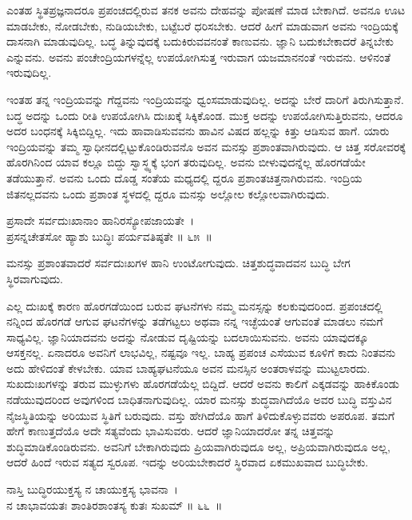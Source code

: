ಎಂತಹ ಸ್ಥಿತಪ್ರಜ್ಞನಾದರೂ ಪ್ರಪಂಚದಲ್ಲಿರುವ ತನಕ ಅವನು ದೇಹವನ್ನು ಪೋಷಣೆ ಮಾಡ ಬೇಕಾಗಿದೆ. ಅವನೂ ಊಟ ಮಾಡಬೇಕು, ನೋಡಬೇಕು, ನುಡಿಯಬೇಕು, ಬಟ್ಟೆಬರೆ ಧರಿಸಬೇಕು. ಆದರೆ ಹೀಗೆ ಮಾಡುವಾಗ ಅವನು ಇಂದ್ರಿಯಕ್ಕೆ ದಾಸನಾಗಿ ಮಾಡುವುದಿಲ್ಲ. ಬದ್ಧ ತಿನ್ನುವುದಕ್ಕೆ ಬದುಕಿರುವವನಂತೆ ಕಾಣುವನು. ಜ್ಞಾನಿ ಬದುಕಬೇಕಾದರೆ ತಿನ್ನಬೇಕು ಎನ್ನುವನು. ಅವನು ಪಂಚೇಂದ್ರಿಯಗಳನ್ನೆಲ್ಲ ಉಪಯೋಗಿಸುತ್ತ ಇರುವಾಗ ಯಜಮಾನನಂತೆ ಇರುವನು. ಆಳಿನಂತೆ ಇರುವುದಿಲ್ಲ.

ಇಂತಹ ತನ್ನ ಇಂದ್ರಿಯವನ್ನು ಗೆದ್ದವನು ಇಂದ್ರಿಯವನ್ನು ಧ್ವಂಸಮಾಡುವುದಿಲ್ಲ. ಅದನ್ನು ಬೇರೆ ದಾರಿಗೆ ತಿರುಗಿಸುತ್ತಾನೆ. ಬದ್ಧ ಅದನ್ನು ಒಂದು ರೀತಿ ಉಪಯೋಗಿಸಿ ದುಃಖಕ್ಕೆ ಸಿಕ್ಕಿಕೊಂಡ. ಮುಕ್ತ ಅದನ್ನು ಉಪಯೋಗಿಸುತ್ತಿರುವನು, ಆದರೂ ಅದರ ಬಂಧನಕ್ಕೆ ಸಿಕ್ಕಿಬಿದ್ದಿಲ್ಲ. ಇದು ಹಾವಾಡಿಸುವವನು ಹಾವಿನ ವಿಷದ ಹಲ್ಲನ್ನು ಕಿತ್ತು ಆಡಿಸುವ ಹಾಗೆ. ಯಾರು ಇಂದ್ರಿಯವನ್ನು ತಮ್ಮ ಸ್ವಾಧೀನದಲ್ಲಿಟ್ಟುಕೊಂಡಿರುವನೊ ಅವನ ಮನಸ್ಸು ಪ್ರಶಾಂತವಾಗಿರುವುದು. ಆ ಚಿತ್ತ ಸರೋವರಕ್ಕೆ ಹೊರಗಿನಿಂದ ಯಾವ ಕಲ್ಲೂ ಬಿದ್ದು ಸ್ವಾಸ್ಥ್ಯಕ್ಕೆ ಭಂಗ ತರುವುದಿಲ್ಲ. ಅವನು ಬೀಳುವುದನ್ನೆಲ್ಲ ಹೊರಗಡೆಯೇ ತಡೆಯುತ್ತಾನೆ. ಅವನು ಒಂದು ದೊಡ್ಡ ಸಂತೆಯ ಮಧ್ಯದಲ್ಲಿ ದ್ದರೂ ಪ್ರಶಾಂತಚಿತ್ತನಾಗಿರುವನು. ಇಂದ್ರಿಯ ಜಿತನಲ್ಲದವನು ಒಂದು ಪ್ರಶಾಂತ ಸ್ಥಳದಲ್ಲಿ ದ್ದರೂ ಮನಸ್ಸು ಅಲ್ಲೋಲ ಕಲ್ಲೋಲವಾಗಿರುವುದು.

\begin{shloka}
ಪ್ರಸಾದೇ ಸರ್ವದುಃಖಾನಾಂ ಹಾನಿರಸ್ಯೋಪಜಾಯತೇ~।\\ಪ್ರಸನ್ನಚೇತಸೋ ಹ್ಯಾಶು ಬುದ್ಧಿಃ ಪರ್ಯವತಿಷ್ಠತೇ \hfill॥ ೬೫~॥
\end{shloka}

\begin{artha}
ಮನಸ್ಸು ಪ್ರಶಾಂತವಾದರೆ ಸರ್ವದುಃಖಗಳ ಹಾನಿ ಉಂಟೋಗುವುದು. ಚಿತ್ತಶುದ್ಧವಾದವನ ಬುದ್ಧಿ ಬೇಗ ಸ್ಥಿರವಾಗುವುದು.
\end{artha}

ಎಲ್ಲ ದುಃಖಕ್ಕೆ ಕಾರಣ ಹೊರಗಡೆಯಿಂದ ಬರುವ ಘಟನೆಗಳು ನಮ್ಮ ಮನಸ್ಸನ್ನು ಕಲಕುವುದರಿಂದ. ಪ್ರಪಂಚದಲ್ಲಿ ನನ್ನಿಂದ ಹೊರಗಡೆ ಆಗುವ ಘಟನೆಗಳನ್ನು ತಡೆಗಟ್ಟಲು ಅಥವಾ ನನ್ನ ಇಚ್ಛೆಯಂತೆ ಆಗುವಂತೆ ಮಾಡಲು ನಮಗೆ ಸಾಧ್ಯವಿಲ್ಲ. ಜ್ಞಾನಿಯಾದವನು ಅದನ್ನು ನೋಡುವ ದೃಷ್ಟಿಯನ್ನು ಬದಲಾಯಿಸುವನು. ಅವನು ಯಾವುದಕ್ಕೂ ಆಸಕ್ತನಲ್ಲ. ಏನಾದರೂ ಅವನಿಗೆ ಲಾಭವಿಲ್ಲ, ನಷ್ಟವೂ ಇಲ್ಲ. ಬಾಹ್ಯ ಪ್ರಪಂಚ ಎಸೆಯುವ ಕೂಳಿಗೆ ಕಾದು ನಿಂತವನು ಅದು ಹೇಳಿದಂತೆ ಕೇಳಬೇಕು. ಯಾವ ಬಾಹ್ಯಘಟನೆಯೂ ಅವನ ಮನಸ್ಸಿನ ಅಂತರಾಳವನ್ನು ಮುಟ್ಟಲಾರದು. ಸುಖದುಃಖಗಳನ್ನು ತರುವ ಮುಳ್ಳುಗಳು ಹೊರಗಡೆಯೆಲ್ಲ ಬಿದ್ದಿದೆ. ಆದರೆ ಅವನು ಕಾಲಿಗೆ ಎಕ್ಕಡವನ್ನು ಹಾಕಿಕೊಂಡು ನಡೆಯುವುದರಿಂದ ಅವುಗಳಿಂದ ಬಾಧಿತನಾಗುವುದಿಲ್ಲ. ಯಾರ ಮನಸ್ಸು ಶುದ್ಧವಾಗಿದೆಯೊ ಅವರ ಬುದ್ಧಿ ವಸ್ತುವಿನ ನೈಜಸ್ಥಿತಿಯನ್ನು ಅರಿಯುವ ಸ್ಥಿತಿಗೆ ಬರುವುದು. ವಸ್ತು ಹೇಗಿದೆಯೊ ಹಾಗೆ ತಿಳಿದುಕೊಳ್ಳುವವರು ಅಪರೂಪ. ತಮಗೆ ಹೇಗೆ ಕಾಣುತ್ತದೆಯೊ ಅದೇ ಸತ್ಯವೆಂದು ಭಾವಿಸುವರು. ಆದರೆ ಜ್ಞಾನಿಯಾದರೋ ತನ್ನ ಚಿತ್ತವನ್ನು ಶುದ್ಧಿಮಾಡಿಕೊಂಡಿರುವನು. ಅವನಿಗೆ ಬೇಕಾಗಿರುವುದು ಪ್ರಿಯವಾಗಿರುವುದೂ ಅಲ್ಲ, ಅಪ್ರಿಯವಾಗಿರುವುದೂ ಅಲ್ಲ, ಆದರೆ ಹಿಂದೆ ಇರುವ ಸತ್ಯದ ಸ್ವರೂಪ. ಇದನ್ನು ಅರಿಯಬೇಕಾದರೆ ಸ್ಥಿರವಾದ ಏಕಮುಖವಾದ ಬುದ್ಧಿಬೇಕು.

\begin{shloka}
ನಾಸ್ತಿ ಬುದ್ಧಿರಯುಕ್ತಸ್ಯ ನ ಚಾಯುಕ್ತಸ್ಯ ಭಾವನಾ~।\\ನ ಚಾಭಾವಯತಃ ಶಾಂತಿರಶಾಂತಸ್ಯ ಕುತಃ ಸುಖಮ್ \hfill॥ ೬೬~॥
\end{shloka}

